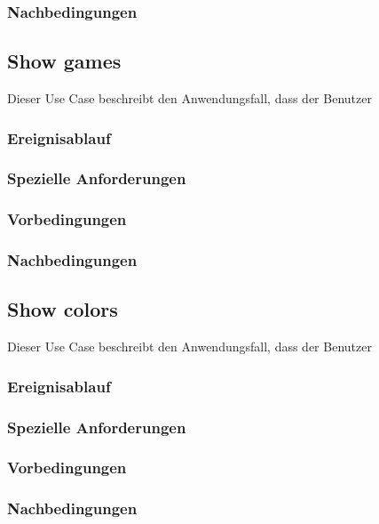 		\subsubsection{Nachbedingungen}
	
	\subsection{Show games}
		Dieser Use Case beschreibt den Anwendungsfall, dass der Benutzer 
			
		\subsubsection{Ereignisablauf}
			
		\subsubsection{Spezielle Anforderungen}		
			
		\subsubsection{Vorbedingungen}
			
		\subsubsection{Nachbedingungen}
	
	\subsection{Show colors}
		Dieser Use Case beschreibt den Anwendungsfall, dass der Benutzer 
			
		\subsubsection{Ereignisablauf}
			
		\subsubsection{Spezielle Anforderungen}		
			
		\subsubsection{Vorbedingungen}
			
		\subsubsection{Nachbedingungen}
	
